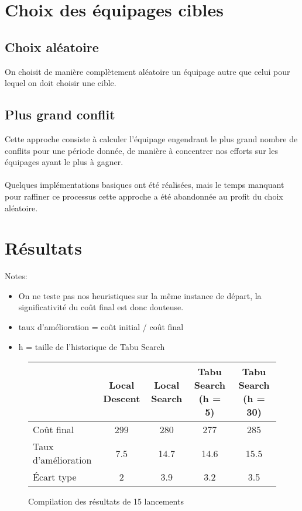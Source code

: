 \documentclass[a4paper,10pt]{report}
\begin{document}
\section{Choix des équipages cibles}
\subsection{Choix aléatoire}
On choisit de manière complètement aléatoire un équipage autre que celui pour lequel on doit choisir
une cible.

\subsection{Plus grand conflit}
Cette approche consiste à calculer l'équipage engendrant le plus grand nombre de conflits pour une
période donnée, de manière à concentrer nos efforts sur les équipages ayant le plus à gagner.

\paragraph{}
Quelques implémentations basiques ont été réalisées, mais le temps manquant pour raffiner ce processus
cette approche a été abandonnée au profit du choix aléatoire.


\pagebreak
\section{Résultats}
Notes: 
\begin{itemize}
	\item On ne teste pas nos heuristiques sur la même instance de départ, la significativité
	du coût final est donc douteuse.
	\item taux d'amélioration = coût initial / coût final
	\item h = taille de l'historique de Tabu Search
\end{itemize}

\begin{figure}[h]
	\begin{tabular}[H]{| l | c | c | c | c |}
		\hline
		 & Local Descent & Local Search & Tabu Search (h = 5) &  Tabu Search (h = 30) \\
		\hline
		Coût final & 299 & 280 & 277 & 285 \\
		\hline
		Taux d'amélioration & 7.5 & 14.7 & 14.6 & 15.5 \\
		\hline
		Écart type & 2 & 3.9 & 3.2 & 3.5\\
		\hline
	\end{tabular}
	\caption{Compilation des résultats de 15 lancements}
\end{figure}
\end{document}
